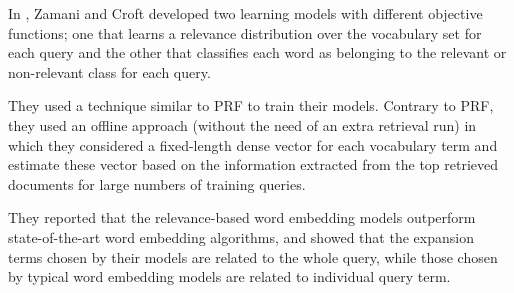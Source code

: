 In \cite{relbasedwe}, Zamani and Croft developed two learning models with different objective functions; one that learns a relevance distribution over the vocabulary set for each query and the other that classifies each word as belonging to the relevant or non-relevant class for each query.

They used a technique similar to PRF to train their models. Contrary to PRF, they used an offline approach (without the need of an extra retrieval run) in which they considered a fixed-length dense vector for each vocabulary term and estimate these vector based on the information extracted from the top retrieved documents for large numbers of training queries.

They reported that the relevance-based word embedding models outperform state-of-the-art word embedding algorithms, and showed that the expansion terms chosen by their models are related to the whole query, while those chosen by typical word embedding models are related to individual query term.
